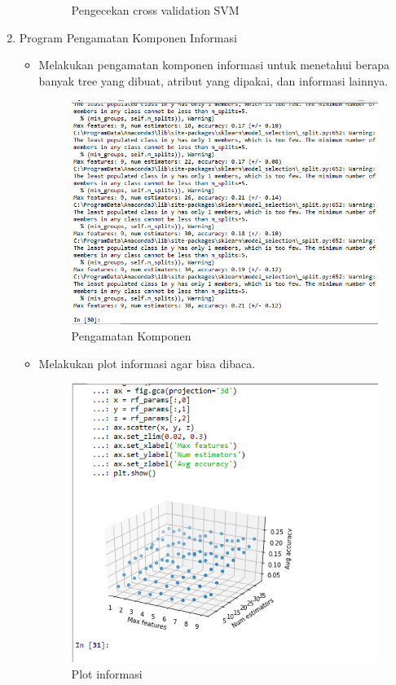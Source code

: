\begin{enumerate}
\begin{itemize}
\begin{figure}[ht]
			\caption{Pengecekan cross validation SVM}
			\label{contoh}
			\end{figure}
	\end{itemize}
\item Program Pengamatan Komponen Informasi
	\begin{itemize}
		\item Melakukan pengamatan komponen informasi untuk menetahui berapa banyak tree yang dibuat, atribut yang dipakai, dan informasi lainnya.
			\begin{figure}[ht]
			\centering
			\includegraphics[scale=0.5]{figures/AIP/ai35.PNG}
			\caption{Pengamatan Komponen}
			\label{contoh}
			\end{figure}
		\item Melakukan plot informasi agar bisa dibaca.
			\begin{figure}[ht]
			\centering
			\includegraphics[scale=0.5]{figures/AIP/ai36.PNG}
			\caption{Plot informasi}
			\label{contoh}
			\end{figure}
	\end{itemize}
\end{enumerate}

